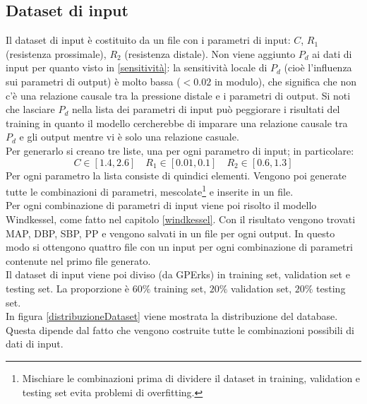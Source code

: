 \subsection{Dataset di input}\label{Risultati training: dataset}
Il dataset di input è costituito da un file con i parametri di input: $C$, $R_1$ (resistenza prossimale), $R_2$ (resistenza distale). Non viene aggiunto $P_d$ ai dati di input per quanto visto in \ref{sensitività}: la sensitività locale di $P_d$ (cioè l'influenza sui parametri di output) è molto bassa ($<0.02$ in modulo), che significa che non c'è una relazione causale tra la pressione distale e i parametri di output. Si noti che lasciare $P_d$ nella lista dei parametri di input può peggiorare i risultati del training in quanto il modello cercherebbe di imparare una relazione causale tra $P_d$ e gli output mentre vi è solo una relazione casuale.\\
Per generarlo si creano tre liste, una per ogni parametro di input; in particolare:
\[
C\in [1.4, 2.6] \quad R_1\in [0.01, 0.1] \quad R_2\in [0.6, 1.3]
\]
Per ogni parametro la lista consiste di quindici elementi. Vengono poi generate tutte le combinazioni di parametri, mescolate\footnote{Mischiare le combinazioni prima di dividere il dataset in training, validation e testing set evita problemi di overfitting.} e inserite in un file.\\
Per ogni combinazione di parametri di input viene poi risolto il modello Windkessel, come fatto nel capitolo \ref{windkessel}. Con il risultato vengono trovati MAP, DBP, SBP, PP e vengono salvati in un file per ogni output. In questo modo si ottengono quattro file con un input per ogni combinazione di parametri contenute nel primo file generato.\\
Il dataset di input viene poi diviso (da GPErks) in training set, validation set e testing set. La proporzione è $60\%$ training set, $20\%$ validation set, $20\%$ testing set.\\

\newpage
In figura \ref{distribuzioneDataset} viene mostrata la distribuzione del database. Questa dipende dal fatto che vengono costruite tutte le combinazioni possibili di dati di input.

